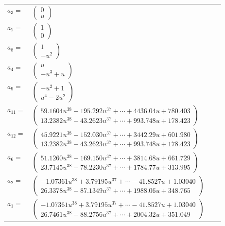 \documentclass[1p]{elsarticle_modified}
\theoremstyle{definition}
\begin{document}
\begin{tabular}{m{7pt} m{180pt} m{7pt} m{180pt} }
\flushright $a_{3}=$&$\begin{pmatrix}0\\u\end{pmatrix}$ \\
\flushright $a_{7}=$&$\begin{pmatrix}1\\0\end{pmatrix}$ \\
\flushright $a_{8}=$&$\begin{pmatrix}1\\- u^2\end{pmatrix}$ \\
\flushright $a_{4}=$&$\begin{pmatrix}u\\- u^3+u\end{pmatrix}$ \\
\flushright $a_{9}=$&$\begin{pmatrix}- u^2+1\\u^4-2 u^2\end{pmatrix}$ \\
\flushright $a_{11}=$&$\begin{pmatrix}59.1604 u^{38}-195.292 u^{37}+\cdots+4436.04 u+780.403\\13.2382 u^{38}-43.2623 u^{37}+\cdots+993.748 u+178.423\end{pmatrix}$ \\
\flushright $a_{12}=$&$\begin{pmatrix}45.9221 u^{38}-152.030 u^{37}+\cdots+3442.29 u+601.980\\13.2382 u^{38}-43.2623 u^{37}+\cdots+993.748 u+178.423\end{pmatrix}$ \\
\flushright $a_{6}=$&$\begin{pmatrix}51.1260 u^{38}-169.150 u^{37}+\cdots+3814.68 u+661.729\\23.7145 u^{38}-78.2230 u^{37}+\cdots+1784.77 u+313.995\end{pmatrix}$ \\
\flushright $a_{2}=$&$\begin{pmatrix}-1.07361 u^{38}+3.79195 u^{37}+\cdots-41.8527 u+1.03040\\26.3378 u^{38}-87.1349 u^{37}+\cdots+1988.06 u+348.765\end{pmatrix}$ \\
\flushright $a_{1}=$&$\begin{pmatrix}-1.07361 u^{38}+3.79195 u^{37}+\cdots-41.8527 u+1.03040\\26.7461 u^{38}-88.2756 u^{37}+\cdots+2004.32 u+351.049\end{pmatrix}$ \\

\end{tabular}
\end{document}

